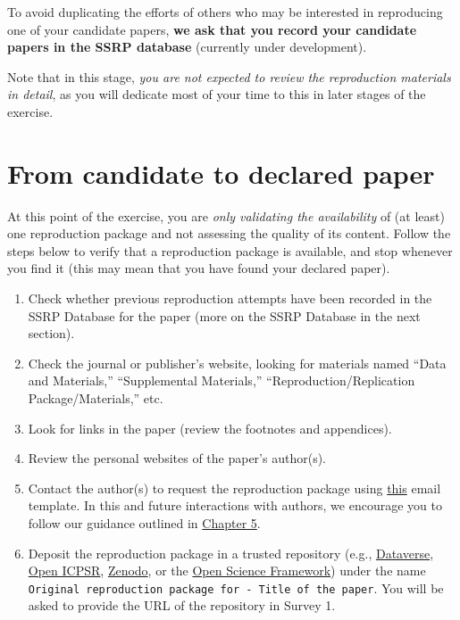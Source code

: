 \documentclass[
]{book}
\providecommand{\tightlist}{%
  \setlength{\itemsep}{0pt}\setlength{\parskip}{0pt}}
\begin{document}
To avoid duplicating the efforts of others who may be interested in reproducing one of your candidate papers, \textbf{we ask that you record your candidate papers in the SSRP database} (currently under development).

Note that in this stage, \emph{you are not expected to review the reproduction materials in detail}, as you will dedicate most of your time to this in later stages of the exercise.

\hypertarget{declare}{%
\section{From candidate to declared paper}\label{declare}}

At this point of the exercise, you are \emph{only validating the availability} of (at least) one reproduction package and not assessing the quality of its content. Follow the steps below to verify that a reproduction package is available, and stop whenever you find it (this may mean that you have found your declared paper).

\begin{enumerate}
\def\labelenumi{\arabic{enumi}.}
\tightlist
\item
  Check whether previous reproduction attempts have been recorded in the SSRP Database for the paper (more on the SSRP Database in the next section).
\item
  Check the journal or publisher's website, looking for materials named ``Data and Materials,'' ``Supplemental Materials,'' ``Reproduction/Replication Package/Materials,'' etc.\\
\item
  Look for links in the paper (review the footnotes and appendices).\\
\item
  Review the personal websites of the paper's author(s).
\item
  Contact the author(s) to request the reproduction package using \href{https://bitss.github.io/ACRE/guidance-for-a-constructive-exchange-between-reproducers-and-original-authors.html\#contacting-the-original-authors-when-there-is-no-reproduction-package}{this} email template. In this and future interactions with authors, we encourage you to follow our guidance outlined in \href{https://bitss.github.io/ACRE/guidance-for-a-constructive-exchange-between-reproducers-and-original-authors.html\#contacting-the-original-authors-when-there-is-no-reproduction-package}{Chapter 5}.
\item
  Deposit the reproduction package in a trusted repository (e.g., \href{https://dataverse.org/}{Dataverse}, \href{https://www.openicpsr.org/openicpsr/}{Open ICPSR}, \href{https://zenodo.org/}{Zenodo}, or the \href{https://osf.io/}{Open Science Framework}) under the name \texttt{Original\ reproduction\ package\ for\ -\ Title\ of\ the\ paper}. You will be asked to provide the URL of the repository in Survey 1.
\end{enumerate}
\end{document}
